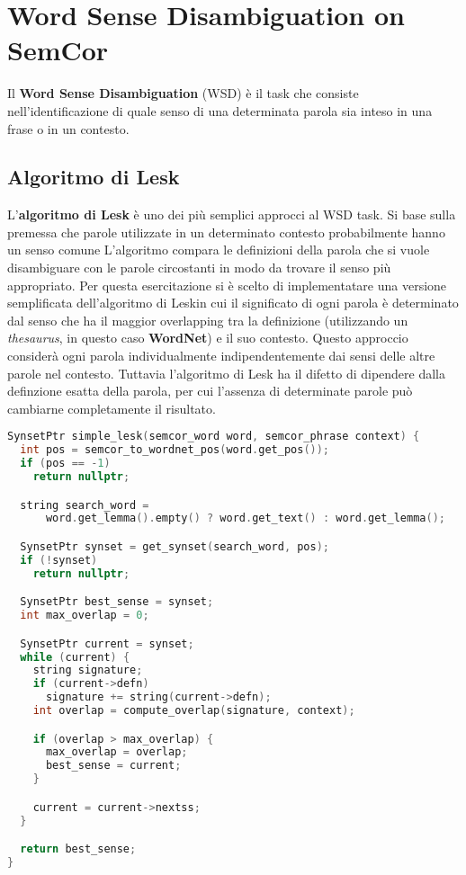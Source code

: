 \chapter{Word Sense Disambiguation on SemCor}

Il \textbf{Word Sense Disambiguation} (WSD) è il task che consiste nell'identificazione di quale senso di una determinata parola sia inteso in una frase o in un contesto. 

\section{Algoritmo di Lesk}

L'\textbf{algoritmo di Lesk} è uno dei più semplici approcci al WSD task. Si base sulla premessa che parole utilizzate in un determinato contesto probabilmente hanno un senso comune L'algoritmo compara le definizioni della parola che si vuole disambiguare con le parole circostanti in modo da trovare il senso più appropriato. Per questa esercitazione si è scelto di implementatare una versione semplificata dell'algoritmo di Leskin cui il significato di ogni parola è determinato dal senso che ha il maggior overlapping tra la definizione (utilizzando un \textit{thesaurus}, in questo caso \textbf{WordNet}) e il suo contesto. Questo approccio considerà ogni parola individualmente indipendentemente dai sensi delle altre parole nel contesto. Tuttavia l'algoritmo di Lesk ha il difetto di dipendere dalla definzione esatta della parola, per cui l'assenza di determinate parole può cambiarne completamente il risultato.

\begin{lstlisting}[language=cpp, caption = Versione semplificata dell'algoritmo di Lesk]
SynsetPtr simple_lesk(semcor_word word, semcor_phrase context) {
  int pos = semcor_to_wordnet_pos(word.get_pos());
  if (pos == -1)
    return nullptr;

  string search_word =
      word.get_lemma().empty() ? word.get_text() : word.get_lemma();

  SynsetPtr synset = get_synset(search_word, pos);
  if (!synset)
    return nullptr;

  SynsetPtr best_sense = synset;
  int max_overlap = 0;

  SynsetPtr current = synset;
  while (current) {
    string signature;
    if (current->defn)
      signature += string(current->defn);
    int overlap = compute_overlap(signature, context);

    if (overlap > max_overlap) {
      max_overlap = overlap;
      best_sense = current;
    }

    current = current->nextss;
  }

  return best_sense;
}\end{lstlisting}

